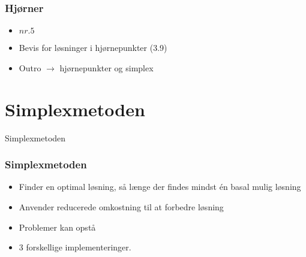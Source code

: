 \begin{frame}
\frametitle{Hjørner}
\begin{itemize}
\item \textbf{$nr. 5$}
\item Bevis for løsninger i hjørnepunkter (3.9)
\item Outro $\rightarrow$ hjørnepunkter og simplex
\end{itemize}
\end{frame}

\section{Simplexmetoden}
\begin{frame}
\centering
\Huge
Simplexmetoden
\end{frame}
%
\begin{frame}
\frametitle{Simplexmetoden}
\begin{itemize}
\item Finder en optimal løsning, så længe der findes mindst én basal mulig løsning
\item Anvender reducerede omkostning til at forbedre løsning
\item Problemer kan opstå
\item 3 forskellige implementeringer.
\end{itemize}
\end{frame}